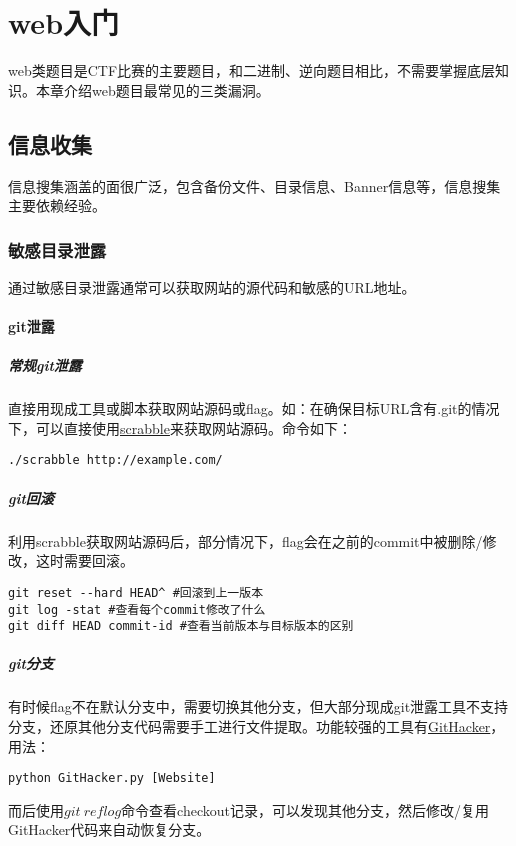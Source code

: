 \chapter{web入门}
web类题目是CTF比赛的主要题目，和二进制、逆向题目相比，不需要掌握底层知识。本章介绍web题目最常见的三类漏洞。


\section{信息收集}
信息搜集涵盖的面很广泛，包含备份文件、目录信息、Banner信息等，信息搜集主要依赖经验。


\subsection{敏感目录泄露}
通过敏感目录泄露通常可以获取网站的源代码和敏感的URL地址。
\subsubsection*{git泄露}

\paragraph*{常规git泄露}
直接用现成工具或脚本获取网站源码或flag。如：在确保目标URL含有.git的情况下，可以直接使用\href{https://github.com/denny0223/scrabble}{scrabble}来获取网站源码。命令如下：
\begin{lstlisting}
./scrabble http://example.com/
\end{lstlisting}

\paragraph*{git回滚}
利用scrabble获取网站源码后，部分情况下，flag会在之前的commit中被删除/修改，这时需要回滚。
\begin{lstlisting}
git reset --hard HEAD^ #回滚到上一版本
git log -stat #查看每个commit修改了什么
git diff HEAD commit-id #查看当前版本与目标版本的区别
\end{lstlisting}

\paragraph*{git分支}
有时候flag不在默认分支中，需要切换其他分支，但大部分现成git泄露工具不支持分支，还原其他分支代码需要手工进行文件提取。功能较强的工具有\href{https://github.com/WangYihang/GitHacker}{GitHacker}，用法：
\begin{lstlisting}
python GitHacker.py [Website]
\end{lstlisting}
而后使用$git\ reflog$命令查看checkout记录，可以发现其他分支，然后修改/复用GitHacker代码来自动恢复分支。

